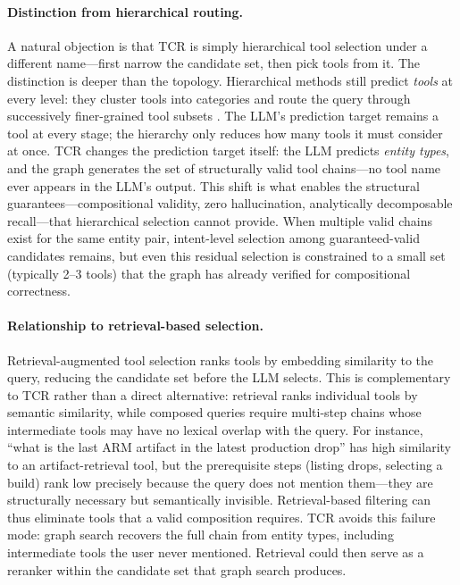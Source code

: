 \paragraph{Distinction from hierarchical routing.}

A natural objection is that TCR is simply hierarchical tool selection under a different name---first narrow the candidate set, then pick tools from it.
The distinction is deeper than the topology.
Hierarchical methods still predict \emph{tools} at every level: they cluster tools into categories and route the query through successively finer-grained tool subsets \cite{qin2024toolllm, li2025toolscope}.
The LLM's prediction target remains a tool at every stage; the hierarchy only reduces how many tools it must consider at once.
TCR changes the prediction target itself: the LLM predicts \emph{entity types}, and the graph generates the set of structurally valid tool chains---no tool name ever appears in the LLM's output.
This shift is what enables the structural guarantees---compositional validity, zero hallucination, analytically decomposable recall---that hierarchical selection cannot provide.
When multiple valid chains exist for the same entity pair, intent-level selection among guaranteed-valid candidates remains, but even this residual selection is constrained to a small set (typically 2--3 tools) that the graph has already verified for compositional correctness.

\paragraph{Relationship to retrieval-based selection.}

Retrieval-augmented tool selection ranks tools by embedding similarity to the query, reducing the candidate set before the LLM selects.
This is complementary to TCR rather than a direct alternative: retrieval ranks individual tools by semantic similarity, while composed queries require multi-step chains whose intermediate tools may have no lexical overlap with the query.
For instance, ``what is the last ARM artifact in the latest production drop'' has high similarity to an artifact-retrieval tool, but the prerequisite steps (listing drops, selecting a build) rank low precisely because the query does not mention them---they are structurally necessary but semantically invisible.
Retrieval-based filtering can thus eliminate tools that a valid composition requires.
TCR avoids this failure mode: graph search recovers the full chain from entity types, including intermediate tools the user never mentioned.
Retrieval could then serve as a reranker within the candidate set that graph search produces.

